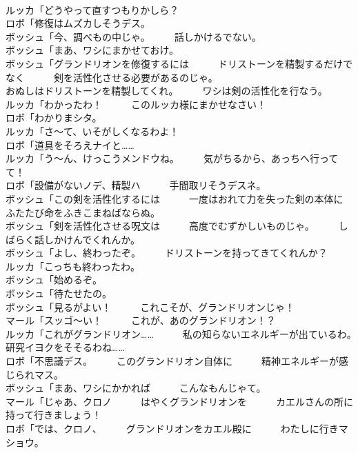 \documentclass[8pt]{extreport}
\begin{document}
\begin{CJK}{UTF8}{min}
\\	ルッカ「どうやって直すつもりかしら？	
\\	ロボ「修復はムズカしそうデス。	
\\	ボッシュ「今、調べもの中じゃ。　　　話しかけるでない。	
\\	ボッシュ「まあ、ワシにまかせておけ。	
\\	ボッシュ「グランドリオンを修復するには　　　ドリストーンを精製するだけでなく　　　剣を活性化させる必要があるのじゃ。	
\\	おぬしはドリストーンを精製してくれ。　　　ワシは剣の活性化を行なう。	
\\	ルッカ「わかったわ！　　　このルッカ様にまかせなさい！	
\\	ロボ「わかりまシタ。	
\\	ルッカ「さ～て、いそがしくなるわよ！	
\\	ロボ「道具をそろえナイと……	
\\	ルッカ「う～ん、けっこうメンドウね。　　　気がちるから、あっちへ行ってて！	
\\	ロボ「設備がないノデ、精製ハ　　　手間取リそうデスネ。	
\\	ボッシュ「この剣を活性化するには　　　一度はおれて力を失った剣の本体に　　　ふたたび命をふきこまねばならぬ。	
\\	ボッシュ「剣を活性化させる呪文は　　　高度でむずかしいものじゃ。　　　しばらく話しかけんでくれんか。	
\\	ボッシュ「よし、終わったぞ。　　　ドリストーンを持ってきてくれんか？	
\\	ルッカ「こっちも終わったわ。	
\\	ボッシュ「始めるぞ。	
\\	ボッシュ「待たせたの。	
\\	ボッシュ「見るがよい！　　　これこそが、グランドリオンじゃ！	
\\	マール「スッゴ～い！　　　これが、あのグランドリオン！？	
\\	ルッカ「これがグランドリオン……　　　私の知らないエネルギーが出ているわ。　　　研究イヨクをそそるわね……	
\\	ロボ「不思議デス。　　　このグランドリオン自体に　　　精神エネルギーが感じられマス。	
\\	ボッシュ「まあ、ワシにかかれば　　　こんなもんじゃて。	
\\	マール「じゃあ、クロノ　　　はやくグランドリオンを　　　カエルさんの所に　　　持って行きましょう！	
\\	ロボ「では、クロノ、　　　グランドリオンをカエル殿に　　　わたしに行きマショウ。	

\end{CJK}
\end{document}
